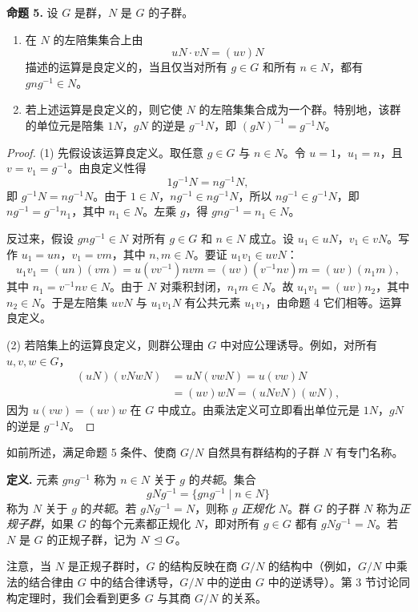 \medskip
\noindent\textbf{命题 5.} 设 $G$ 是群，$N$ 是 $G$ 的子群。
\begin{enumerate}[label=(\arabic*)]
  \item 在 $N$ 的左陪集集合上由
  \[
    uN\cdot vN=(uv)N
  \]
  描述的运算是良定义的，当且仅当对所有 $g\in G$ 和所有 $n\in N$，都有 $gng^{-1}\in N$。
  \item 若上述运算是良定义的，则它使 $N$ 的左陪集集合成为一个群。特别地，该群的单位元是陪集 $1N$，$gN$ 的逆是 $g^{-1}N$，即 $(gN)^{-1}=g^{-1}N$。
\end{enumerate}

\begin{proof}
(1) 先假设该运算良定义。取任意 $g\in G$ 与 $n\in N$。令 $u=1$，$u_1=n$，且 $v=v_1=g^{-1}$。由良定义性得
\[
  1g^{-1}N=ng^{-1}N,
\]
即 $g^{-1}N=ng^{-1}N$。由于 $1\in N$，$ng^{-1}\in ng^{-1}N$，所以 $ng^{-1}\in g^{-1}N$，即 $ng^{-1}=g^{-1}n_1$，其中 $n_1\in N$。左乘 $g$，得 $gng^{-1}=n_1\in N$。

反过来，假设 $gng^{-1}\in N$ 对所有 $g\in G$ 和 $n\in N$ 成立。设 $u_1\in uN$，$v_1\in vN$。写作 $u_1=un$，$v_1=vm$，其中 $n,m\in N$。要证 $u_1v_1\in uvN$：
\[
  u_1v_1=(un)(vm)=u(vv^{-1})nvm=(uv)(v^{-1}nv)m=(uv)(n_1m),
\]
其中 $n_1=v^{-1}nv\in N$。由于 $N$ 对乘积封闭，$n_1m\in N$。故 $u_1v_1=(uv)n_2$，其中 $n_2\in N$。于是左陪集 $uvN$ 与 $u_1v_1N$ 有公共元素 $u_1v_1$，由命题 4 它们相等。运算良定义。

(2) 若陪集上的运算良定义，则群公理由 $G$ 中对应公理诱导。例如，对所有 $u,v,w\in G$，
\begin{align*}
  (uN)(vNwN)&=uN(vwN)=u(vw)N\\
  &=(uv)wN=(uNvN)(wN),
\end{align*}
因为 $u(vw)=(uv)w$ 在 $G$ 中成立。由乘法定义可立即看出单位元是 $1N$，$gN$ 的逆是 $g^{-1}N$。
\end{proof}

如前所述，满足命题 5 条件、使商 $G/N$ 自然具有群结构的子群 $N$ 有专门名称。

\noindent\textbf{定义.} 元素 $gng^{-1}$ 称为 $n\in N$ 关于 $g$ 的\emph{共轭}。集合
\[
  gNg^{-1}=\{gng^{-1}\mid n\in N\}
\]
称为 $N$ 关于 $g$ 的\emph{共轭}。若 $gNg^{-1}=N$，则称 $g$ \emph{正规化} $N$。群 $G$ 的子群 $N$ 称为\emph{正规子群}，如果 $G$ 的每个元素都正规化 $N$，即对所有 $g\in G$ 都有 $gNg^{-1}=N$。若 $N$ 是 $G$ 的正规子群，记为 $N\trianglelefteq G$。

注意，当 $N$ 是正规子群时，$G$ 的结构反映在商 $G/N$ 的结构中（例如，$G/N$ 中乘法的结合律由 $G$ 中的结合律诱导，$G/N$ 中的逆由 $G$ 中的逆诱导）。第 3 节讨论同构定理时，我们会看到更多 $G$ 与其商 $G/N$ 的关系。

